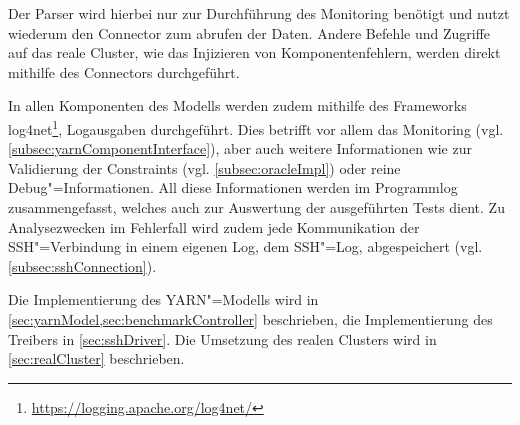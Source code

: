 Der Parser wird hierbei nur zur Durchführung des Monitoring benötigt und nutzt wiederum den Connector zum abrufen der Daten.
Andere Befehle und Zugriffe auf das reale Cluster, wie \zB das Injizieren von Komponentenfehlern, werden direkt mithilfe des Connectors durchgeführt.

In allen Komponenten des Modells werden zudem mithilfe des Frameworks log4net\footnote{\url{https://logging.apache.org/log4net/}}, Logausgaben durchgeführt.
Dies betrifft vor allem das Monitoring (vgl. \cref{subsec:yarnComponentInterface}), aber auch weitere Informationen wie zur Validierung der Constraints (vgl. \cref{subsec:oracleImpl}) oder reine Debug"=Informationen.
All diese Informationen werden im Programmlog zusammengefasst, welches auch zur Auswertung der ausgeführten \glspl{Test} dient.
Zu Analysezwecken im Fehlerfall wird zudem jede Kommunikation der SSH"=Verbindung in einem eigenen Log, dem SSH"=Log, abgespeichert (vgl. \cref{subsec:sshConnection}).

Die Implementierung des \gls{YARN}"=Modells wird in \cref{sec:yarnModel,sec:benchmarkController} beschrieben, die Implementierung des Treibers in \cref{sec:sshDriver}.
Die Umsetzung des realen Clusters wird in \cref{sec:realCluster} beschrieben.
